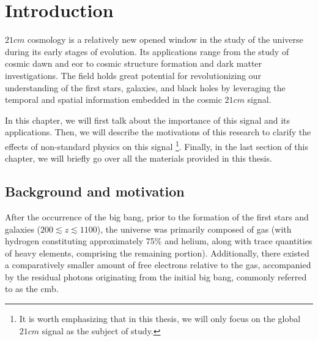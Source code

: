 \documentclass[12pt, TexShade, letterpaper]{report}
\begin{document}
 	\clearpage
	
	\glsresetall
\chapter{Introduction}
\label{chap:intro}
$21cm$ cosmology is a relatively new opened window in the study of the universe during its early stages of evolution. Its applications range from the study of cosmic dawn and \gls{eor} to cosmic structure formation and dark matter investigations\cite{SKA_dark_ages}. The field holds great potential for revolutionizing our understanding of the first stars, galaxies, and black holes by leveraging the temporal and spatial information embedded in the cosmic $21cm$ signal\cite{21cmfast_c}.\par
In this chapter, we will first talk about the importance of this signal and its applications. Then, we will describe the motivations of this research to clarify the effects of non-standard physics on this signal \footnote{It is worth emphasizing that in this thesis, we will only focus on the global $21cm$ signal as the subject of study.}. Finally, in the last section of this chapter, we will briefly go over all the materials provided in this thesis.\par
\section{Background and motivation}
After the occurrence of the big bang, prior to the formation of the first stars and galaxies ($200 \lesssim z \lesssim 1100$), the universe was primarily composed of gas (with hydrogen constituting approximately 75\% and helium, along with trace quantities of heavy elements, comprising the remaining portion). Additionally, there existed a comparatively smaller amount of free electrons relative to the gas, accompanied by the residual photons originating from the initial big bang, commonly referred to as the \gls{cmb}\cite{map_universe, 21century}.
\end{document}

